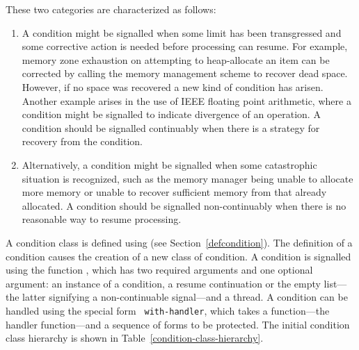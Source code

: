 \begin{optDefinition}
\noindent
These two categories are characterized as follows:
\begin{enumerate}
%
    \item {} A condition might be signalled
    when some limit has been transgressed and some corrective action is needed
    before processing can resume.  For example, memory zone exhaustion on
    attempting to heap-allocate an item can be corrected by calling the memory
    management scheme to recover dead space.  However, if no space was recovered
    a new kind of condition has arisen.  Another example arises in the use of
    IEEE floating point arithmetic, where a condition might be signalled to
    indicate divergence of an operation.  A condition should be signalled
    continuably when there is a strategy for recovery from the condition.
%
    \item {} Alternatively, a condition
    might be signalled when some catastrophic situation is recognized, such as
    the memory manager being unable to allocate more memory or unable to recover
    sufficient memory from that already allocated.  A condition should be
    signalled non-continuably when there is no reasonable way to resume
    processing.
%
\end{enumerate}
%
A condition class is defined using  (see
Section~\ref{defcondition}).  The definition of a condition causes the
creation of a new class of condition.  A condition is signalled using
the function , which has two required arguments and one
optional argument: an instance of a condition, a resume continuation
or the empty list---the latter signifying a non-continuable signal---and a
thread.  A condition can be handled using the special form {\tt
with-handler}, which takes a function---the handler function---and a
sequence of forms to be protected.  The initial condition class
hierarchy is shown in Table~\ref{condition-class-hierarchy}.
%
\begin{figure}
{\tt
{}\\
\tts{}\\
\tts\tts{}\\
\tts\tts{}\\
\tts\tts{}\\
\tts{}\\
\tts{}\\
}
\end{figure}
\end{optDefinition}
